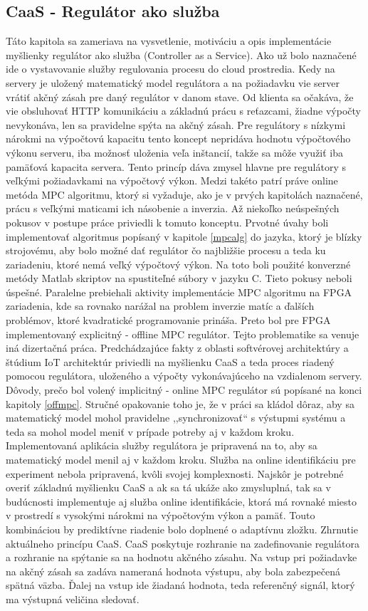 \subsection{CaaS - Regulátor ako služba} \label{caas}
Táto kapitola sa zameriava na vysvetlenie, motiváciu a opis implementácie myšlienky regulátor ako služba (Controller as a Service). Ako už bolo naznačené ide o vystavovanie služby regulovania procesu do cloud prostredia. Kedy na servery je uložený matematický model regulátora a na požiadavku vie server vrátiť akčný zásah pre daný regulátor v danom stave. Od klienta sa očakáva, že vie obsluhovať HTTP komunikáciu a základnú prácu s reťazcami, žiadne výpočty nevykonáva, len sa pravidelne spýta na akčný zásah. Pre regulátory s nízkymi nárokmi na výpočtovú kapacitu tento koncept nepridáva hodnotu výpočtového výkonu serveru, iba možnosť uloženia veľa inštancií, takže sa môže využiť iba pamäťová kapacita servera. Tento princíp dáva zmysel hlavne pre regulátory s veľkými požiadavkami na výpočtový výkon. Medzi takéto patrí práve online metóda MPC algoritmu, ktorý si vyžaduje, ako je v prvých kapitolách naznačené, prácu s veľkými maticami ich násobenie a  inverzia. Až niekoľko neúspešných pokusov v postupe práce priviedli k tomuto konceptu. Prvotné úvahy boli implementovať algoritmus popísaný v kapitole \ref{mpcalg} do jazyka, ktorý je blízky strojovému, aby bolo možné dať regulátor čo najbližšie procesu a teda ku zariadeniu, ktoré nemá veľký výpočtový výkon. Na toto boli použité konverzné metódy Matlab skriptov na spustiteľné súbory v jazyku C. Tieto pokusy neboli úspešné. Paralelne prebiehali aktivity implementácie MPC algoritmu na FPGA zariadenia, kde sa rovnako narážal na problem inverzie matíc a ďalších problémov, ktoré kvadratické programovanie prináša. Preto bol pre FPGA implementovaný explicitný - offline MPC regulátor. Tejto problematike sa venuje iná dizertačná práca. Predchádzajúce fakty z oblasti softvérovej architektúry a štúdium IoT architektúr priviedli na myšlienku CaaS a teda proces riadený pomocou regulátora, uloženého a výpočty vykonávajúceho na vzdialenom servery. Dôvody, prečo bol volený implicitný - online MPC regulátor sú popísané na konci kapitoly \ref{offmpc}. Stručné opakovanie toho je, že v práci sa kládol dôraz, aby sa matematický model mohol pravidelne ,,synchronizovať`` s výstupmi systému a teda sa mohol model meniť v prípade potreby aj v každom kroku. Implementovaná aplikácia služby regulátora je pripravená na to, aby sa matematický model menil aj v každom kroku. Služba na online identifikáciu pre experiment nebola pripravená, kvôli svojej komplexnosti. Najskôr je potrebné overiť základnú myšlienku CaaS a ak sa tá ukáže ako zmysluplná, tak sa v budúcnosti implementuje aj služba online identifikácie, ktorá má rovnaké miesto v prostredí s vysokými nárokmi na výpočtovým výkon a pamäť. Touto kombináciou by prediktívne riadenie bolo doplnené o adaptívnu zložku. Zhrnutie aktuálneho princípu CaaS. CaaS poskytuje rozhranie na zadefinovanie regulátora a rozhranie na spýtanie sa na hodnotu akčného zásahu. Na vstup pri požiadavke na akčný zásah sa zadáva nameraná hodnota výstupu, aby bola zabezpečená spätná väzba. Ďalej na vstup ide žiadaná hodnota, teda referenčný signál, ktorý ma výstupná veličina sledovať.  
